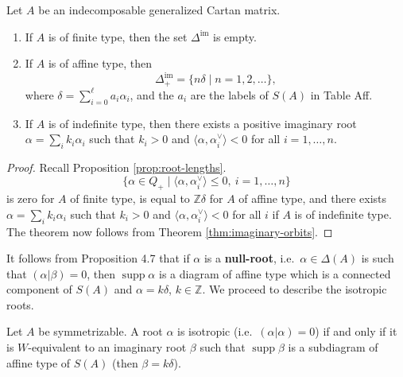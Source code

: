 \documentclass[12pt]{article}
\begin{document}
\begin{theorem}\label{thm:imaginary-roots}
    Let $A$ be an indecomposable generalized Cartan matrix.
    \begin{enumerate}[label=\alph*)]
        \item If $A$ is of finite type, then the set $\Delta^{\mathrm{im}}$ is empty.
        \item If $A$ is of affine type, then
              \[
                  \Delta^{\mathrm{im}}_+ = \{n\delta \mid n=1,2,\dots\},
              \]
              where $\delta = \sum_{i=0}^\ell a_i \alpha_i$, and the $a_i$ are the labels of $S(A)$
              in Table Aff.
        \item If $A$ is of indefinite type, then there exists a positive imaginary root
              $\alpha = \sum_i k_i \alpha_i$ such that $k_i>0$ and
              $\langle \alpha,\alpha_i^\vee\rangle < 0$ for all $i=1,\dots,n$.
    \end{enumerate}
\end{theorem}

\begin{proof}
    Recall Proposition \ref{prop:root-lengths}.
    \[
        \{\alpha \in Q_+ \mid \langle \alpha,\alpha_i^\vee \rangle \leq 0, \ i=1,\dots,n\}
    \]
    is zero for $A$ of finite type, is equal to $\mathbb{Z}\delta$ for $A$ of affine type,
    and there exists $\alpha=\sum_i k_i\alpha_i$ such that $k_i>0$ and
    $\langle \alpha,\alpha_i^\vee\rangle <0$ for all $i$ if $A$ is of indefinite type.
    The theorem now follows from Theorem \ref{thm:imaginary-orbits}.
\end{proof}

It follows from Proposition 4.7 that if $\alpha$ is a \textbf{null-root}, i.e.\
$\alpha \in \Delta(A)$ is such that $(\alpha|\beta)=0$, then $\operatorname{supp}\alpha$
is a diagram of affine type which is a connected component of $S(A)$ and
$\alpha=k\delta$, $k\in\mathbb{Z}$. We proceed to describe the isotropic roots.

\begin{proposition}\label{prop:isotropic-roots}
    Let $A$ be symmetrizable. A root $\alpha$ is isotropic
    (i.e.\ $(\alpha|\alpha)=0$) if and only if it is $W$-equivalent to an imaginary root
    $\beta$ such that $\operatorname{supp}\beta$ is a subdiagram of affine type of $S(A)$
    (then $\beta=k\delta$).
\end{proposition}
\end{document}
